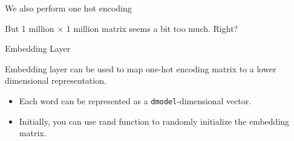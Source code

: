 \documentclass[aspectratio=169,xcolor=dvipsnames,svgnames,x11names,fleqn]{beamer}
\begin{document}
\begin{frame}{We also perform one hot encoding}

But 1 million $\times$ 1 million matrix seems a bit too much. Right?
   
\end{frame}


\begin{frame}[fragile]{Embedding Layer}

    
    \begin{tcolorbox}[colback=embedDark!5, colframe=embedDark, arc=0mm, leftrule=3pt, boxrule=0pt]
        \small Embedding layer can be used to map one-hot encoding matrix to a lower dimensional representation.
    \end{tcolorbox}

    \begin{itemize}
        \item[\textcolor{embedBlue}{\faIcon{vector-square}}] Each word can be represented as a {\color{embedDark}\texttt{dmodel}}-dimensional vector.
        \item[\textcolor{embedGold}{\faIcon{dice}}] Initially, you can use rand function to randomly initialize the embedding matrix.
    \end{itemize}

    \vspace{3pt}


\end{frame}
\end{document}
